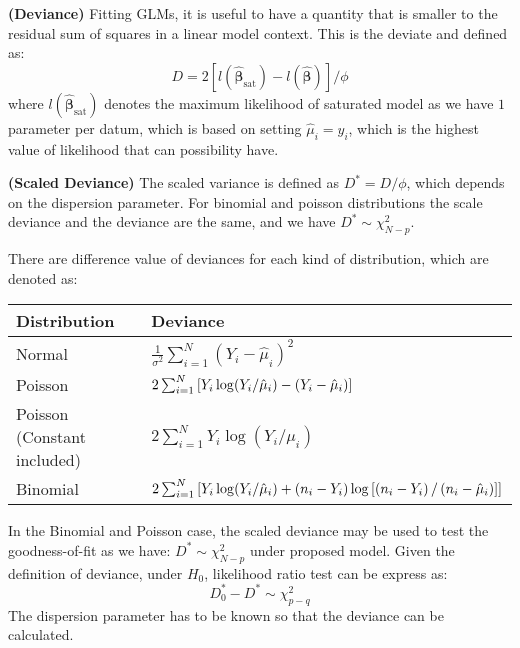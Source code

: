 \begin{definition}{\textbf{(Deviance)}}
    Fitting GLMs, it is useful to have a quantity that is smaller to the residual sum of squares in a linear model context. This is the deviate and defined as:
    \begin{equation*}
        D = 2[l(\hat{\boldsymbol \beta}_\text{sat}) - l(\hat{\boldsymbol \beta})]/\phi
    \end{equation*}
    where $l(\hat{\boldsymbol \beta}_\text{sat})$ denotes the maximum likelihood of saturated model as we have $1$ parameter per datum, which is based on setting $\hat{\mu}_i = y_i$, which is the highest value of likelihood that can possibility have. 
\end{definition}

\begin{definition}{\textbf{(Scaled Deviance)}}
    The scaled variance is defined as $D^* = D/\phi$, which depends on the dispersion parameter. For binomial and poisson distributions the scale deviance and the deviance are the same, and we have $D^* \sim \chi^2_{N-p}$.
\end{definition}

\begin{remark}
    There are difference value of deviances for each kind of distribution, which are denoted as:
    \begin{table}[H]
    \centering
    \begin{tabular}{ll}
        \toprule
        \textbf{Distribution}   & \textbf{Deviance}  \\
        \midrule
        Normal & $\frac{1}{\sigma^2}\sum^N_{i=1}(Y_i-\hat{\mu}_i)^2$ \\
        Poisson & $2\sum^N_{i=1}\left[ Y_i\log(Y_i/\hat{\mu}_i) - (Y_i - \hat{\mu}_i) \right]$ \\
        Poisson (Constant included) & $2\sum^N_{i=1}Y_i\log(Y_i/\hat{\mu}_i) $ \\
        Binomial & $2\sum^N_{i=1}\left[ Y_i\log(Y_i/\hat{\mu}_i) + (n_i-Y_i)\log\left[ \left( n_i - Y_i \right)/\left( n_i-\hat{\mu}_i \right)  \right] \right]$ \\
        \bottomrule
    \end{tabular}
    \end{table}
\end{remark}

\begin{remark} 
    In the Binomial and Poisson case, the scaled deviance may be used to test the goodness-of-fit as we have: $D^*\sim\chi^2_{N-p}$ under proposed model. Given the definition of deviance, under $H_0$, likelihood ratio test can be express as:
    \begin{equation*}
        D_0^* - D^* \sim \chi^2_{p-q}
    \end{equation*}
    The dispersion parameter has to be known so that the deviance can be calculated. 
\end{remark}

